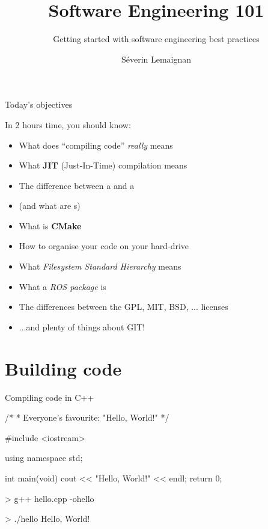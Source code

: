 \documentclass[compress]{beamer}
\title{Software Engineering 101}
\subtitle{Getting started with software engineering best practices}
\date{}
\author{Séverin Lemaignan}
\institute{Bristol Robotics Lab\\{\bf University of West of England}}
\makeatletter
\let\beamer@writeslidentry@miniframeson=\beamer@writeslidentry
\def\beamer@writeslidentry@miniframesoff{%
  \expandafter\beamer@ifempty\expandafter{\beamer@framestartpage}{}%
  {%
    \clearpage\beamer@notesactions%
  }
}
\newcommand*{\miniframeson}{\let\beamer@writeslidentry=\beamer@writeslidentry@miniframeson}
\newcommand*{\miniframesoff}{\let\beamer@writeslidentry=\beamer@writeslidentry@miniframesoff}
\makeatother
\begin{document}

\maketitle

\miniframesoff

\begin{frame}{Today's objectives}

    In 2 hours time, you should know:

    \begin{itemize}
        \item What does ``compiling code'' \emph{really} means
        \item What \textbf{JIT} (Just-In-Time) compilation means
        \item The difference between a  and a 
        \item (and what are s)
        \item What is {\bf CMake}
        \item How to organise your code on your hard-drive
        \item What \emph{Filesystem Standard Hierarchy} means
        \item What a \emph{ROS package} is
        \item The differences between the GPL, MIT, BSD, ... licenses
        \item ...and plenty of things about GIT!
    \end{itemize}
\end{frame}

\miniframeson

\section[Compilation]{Building code}

\begin{frame}[fragile]{Compiling code in C++}

\begin{cppcode}
/*
 * Everyone's favourite: "Hello, World!"
 */

#include <iostream>

using namespace std;

int main(void)
{
    cout << "Hello, World!" << endl;
    return 0;
}
\end{cppcode}

\pause

\begin{shcode}
> g++ hello.cpp -ohello
\end{shcode}

\pause 

\begin{shcode}
> ./hello
Hello, World!
\end{shcode}

\end{frame}
\end{document}
